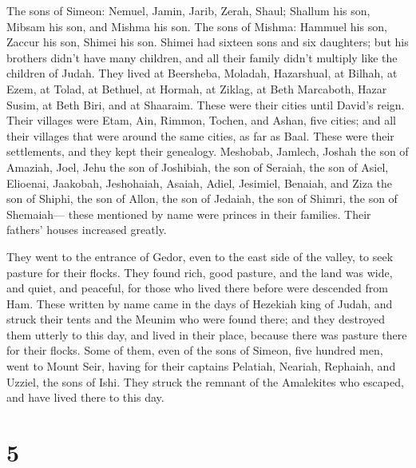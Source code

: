  The sons of Simeon: Nemuel, Jamin, Jarib, Zerah, Shaul;
 Shallum his son, Mibsam his son, and Mishma his son.
 The sons of Mishma: Hammuel his son, Zaccur his son,
Shimei his son.  Shimei had sixteen sons and six daughters;
but his brothers didn't have many children, and all their family didn't
multiply like the children of Judah.  They lived at
Beersheba, Moladah, Hazarshual,  at Bilhah, at Ezem, at
Tolad,  at Bethuel, at Hormah, at Ziklag,  at
Beth Marcaboth, Hazar Susim, at Beth Biri, and at Shaaraim. These were
their cities until David's reign.  Their villages were
Etam, Ain, Rimmon, Tochen, and Ashan, five cities;  and all
their villages that were around the same cities, as far as Baal. These
were their settlements, and they kept their genealogy. 
Meshobab, Jamlech, Joshah the son of Amaziah,  Joel, Jehu
the son of Joshibiah, the son of Seraiah, the son of Asiel,
 Elioenai, Jaakobah, Jeshohaiah, Asaiah, Adiel, Jesimiel,
Benaiah,  and Ziza the son of Shiphi, the son of Allon, the
son of Jedaiah, the son of Shimri, the son of Shemaiah--- 
these mentioned by name were princes in their families. Their fathers'
houses increased greatly.

 They went to the entrance of Gedor, even to the east side
of the valley, to seek pasture for their flocks.  They
found rich, good pasture, and the land was wide, and quiet, and
peaceful, for those who lived there before were descended from Ham.
 These written by name came in the days of Hezekiah king of
Judah, and struck their tents and the Meunim who were found there; and
they destroyed them utterly to this day, and lived in their place,
because there was pasture there for their flocks.  Some of
them, even of the sons of Simeon, five hundred men, went to Mount Seir,
having for their captains Pelatiah, Neariah, Rephaiah, and Uzziel, the
sons of Ishi.  They struck the remnant of the Amalekites
who escaped, and have lived there to this day.

\hypertarget{section-4}{%
\section{5}\label{section-4}}


